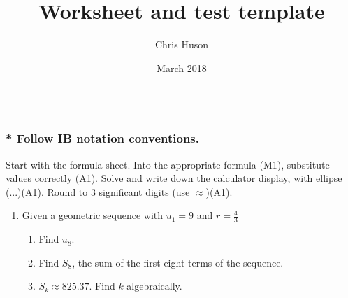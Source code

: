 \documentclass[12pt, oneside]{article}
\title{Worksheet and test template}
\author{Chris Huson}
\date{March 2018}
\begin{document}
\subsubsection*{\\* Follow IB notation conventions.} Start with the formula sheet. Into the appropriate formula (M1), substitute values correctly (A1). Solve and write down the calculator display, with ellipse (...)(A1). Round to 3 significant digits (use $\approx$)(A1).

\begin{enumerate}

\subsubsection*{Geometric sequence and series}

\item Given a geometric sequence with $u_1=9$ and $r=\frac{4}{3}$
  \begin{enumerate}
      \item Find $u_8$.\\[115pt]
      \item Find $S_8$, the sum of the first eight terms of the sequence.\\[155pt]
      \item $S_k\approx 825.37$. Find $k$ algebraically.
  \end{enumerate}


\end{enumerate}
\end{document}
